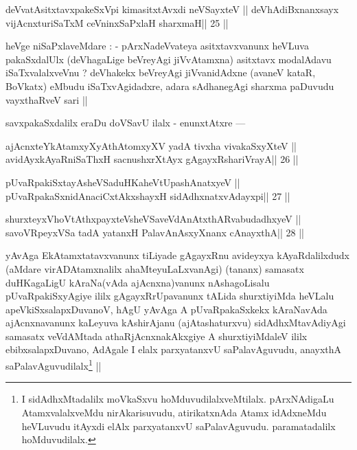 \begin{shl}
deVvatAsitxtavxpakeSxV\s pi kimasitxtAvxdi neVSayxteV ||
deVhAdiBxnanxsayx vijAcnxturiSaTxM ceVninxSaPxlaH sharxmaH\hfill || 25 ||
\end{shl}

\begin{artha}
heVge niSaPxlaveMdare : - pArxNadeVvateya asitxtavxvanunx heVLuva 
pakaSxdalUlx (deVhagaLige beVreyAgi jiVvAtamxna) asitxtavx modalAdavu 
iSaTxvalalxveVnu ? deVhakekx beVreyAgi jiVvanidAdxne (avaneV kataR, BoVkatx) eMbudu iSaTxvAgidadxre, adara sAdhanegAgi sharxma paDuvudu vayxthaRveV sari ||
\end{artha}

\begin{artha}
savxpakaSxdalilx eraDu doVSavU ilalx - enunxtAtxre ---
\end{artha}

\begin{shl}
ajAcnxteYkAtamxyXyAthAtomxyXV yadA tivxha vivakaSxyXteV ||
avidAyxkAyaRniSaThxH sacnushxrXtAyx gAgayxRshariVrayA\hfill || 26 ||
\end{shl}

\begin{shl}
pUvaRpakiSxtayA\s sheVSaduHKaheVtUpashAnatxyeV ||
pUvaRpakaSxnidAnaciCxtAkxshayxH sidAdhxnatxvAdayxpi\hfill || 27 ||
\end{shl}

\begin{shl}
shurxteyxVhoVtAthxpayxteV\s sheVSaveVdAnAtxthARvabudadhxyeV ||
savoVR\s peyxVSa tadA yatanxH PalavAnAsxyXnanx cAnayxthA\hfill || 28 ||
\end{shl}

\begin{artha}
yAvAga EkAtamxtatavxvanunx tiLiyade gAgayxRnu avideyxya kAyaRdalilxdudx 
(aMdare virADAtamxnalilx ahaMteyuLaLxvanAgi) (tananx) samasatx 
duHKagaLigU kAraNa(vAda ajAcnxna)vanunx nAshagoLisalu pUvaRpakiSxyAgiye 
ililx gAgayxRrUpavanunx tALida shurxtiyiMda heVLalu 
apeVkiSxsalapxDuvanoV, hAgU yAvAga A pUvaRpakaSxkekx kAraNavAda ajAcnxnavanunx kaLeyuva kAshirAjanu (ajAtashaturxvu) sidAdhxMtavAdiyAgi samasatx veVdAMtada athaRjAcnxnakAkxgiye A shurxtiyiMdaleV ililx ebibxsalapxDuvano, AdAgale I elalx parxyatanxvU saPalavAguvudu, anayxthA saPalavAguvudilalx\footnote[2]{I sidAdhxMtadalilx moVkaSxvu hoMduvudilalxveMtilalx. pArxNAdigaLu AtamxvalalxveMdu nirAkarisuvudu, atirikatxnAda Atamx idAdxneMdu heVLuvudu itAyxdi elAlx parxyatanxvU saPalavAguvudu. paramatadalilx hoMduvudilalx.} ||
\end{artha}

